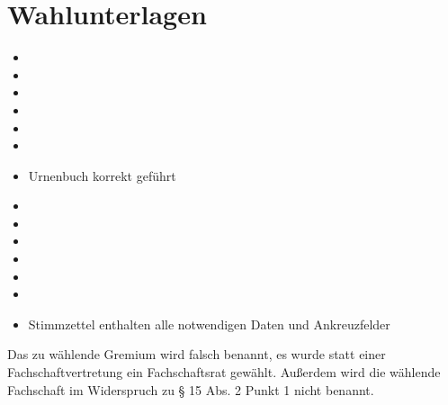 \documentclass[a4paper]{scrartcl}
\newcommand{\fullcheck}{\raisebox{-.8\dp\strutbox}{\texttt{[image: Check.pdf]}}}
\newcommand{\semicheck}{\raisebox{-.8\dp\strutbox}{\texttt{[image: Semicheck.pdf]}}}
\newcommand{\nocheck}{\raisebox{-.8\dp\strutbox}{\texttt{[image: Nocheck.pdf]}}}
\newcommand{\dontknow}{\raisebox{-.8\dp\strutbox}{\texttt{[image: Dontknow.pdf]}}}
\newcommand{\notrev}{\raisebox{-.8\dp\strutbox}{\texttt{[image: Notrev.pdf]}}}
\newcommand{\sym}[1]{
\ifcase#1 \item[$\Box$]
\or \item[\fullcheck]
\or \item[\semicheck]
\or \item[\nocheck]
\or \item[\dontknow]
\or \item[\notrev]
\else \item[$\Box$]
\fi}
\begin{document}







\section{Wahlunterlagen}
\begin{itemize}[label=$\Box$]
\sym{1} Urnenbuch korrekt geführt
\sym{3} Stimmzettel enthalten alle notwendigen Daten und Ankreuzfelder
\end{itemize}

Das zu wählende Gremium wird falsch benannt, es wurde statt einer Fachschaftvertretung ein Fachschaftsrat gewählt. Außerdem wird die wählende Fachschaft im Widerspruch zu § 15 Abs. 2 Punkt 1 nicht benannt.




\end{document}
